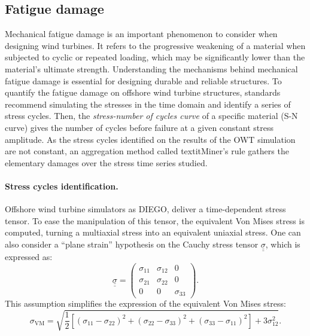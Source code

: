 
\subsection{Fatigue damage}

Mechanical fatigue damage is an important phenomenon to consider when designing wind turbines. 
It refers to the progressive weakening of a material when subjected to cyclic or repeated loading, which may be significantly lower than the material's ultimate strength. 
Understanding the mechanisms behind mechanical fatigue damage is essential for designing durable and reliable structures. 
To quantify the fatigue damage on offshore wind turbine structures, standards \citep{dnv_fatigue_2016} recommend simulating the stresses in the time domain and identify a series of stress cycles. 
Then, the \textit{stress-number of cycles curve} of a specific material (S-N curve) gives the number of cycles before failure at a given constant stress amplitude. 
As the stress cycles identified on the results of the OWT simulation are not constant, an aggregation method called textit{Miner's rule} gathers the elementary damages over the stress time series studied. 


\paragraph{Stress cycles identification.}
Offshore wind turbine simulators as DIEGO, deliver a time-dependent stress tensor. 
To ease the manipulation of this tensor, the equivalent Von Mises stress is computed, turning a multiaxial stress into an equivalent uniaxial stress. 
One can also consider a ``plane strain'' hypothesis on the Cauchy stress tensor $\underline{\underline{\sigma}}$, which is expressed as:
\begin{equation}
    \underline{\underline{\sigma}} = \begin{pmatrix}
                            \sigma_{11} & \sigma_{12} & 0\\
                            \sigma_{21} & \sigma_{22} & 0\\
                            0 & 0 & \sigma_{33}
                            \end{pmatrix}.
\end{equation}
This assumption simplifies the expression of the equivalent Von Mises stress: 
\begin{equation}
    \sigma _{\mathrm{VM}}=\sqrt{{\frac {1}{2}}\left[(\sigma _{11}-\sigma _{22})^{2}+(\sigma _{22}-\sigma _{33})^{2}+(\sigma _{33}-\sigma _{11})^{2}\right] + 3 \sigma _{12}^{2}}.
\end{equation}

